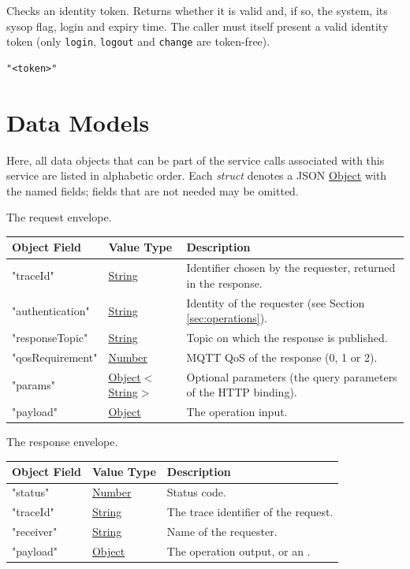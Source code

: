 \documentclass[a4paper]{arrowhead}
\newcommand{\mref}[2][]{{\textcolor{ArrowheadPurple}{\hyperref[sec:model:#2]{\ifstrempty{#1}{#2}{#1}}}}}
\newcommand{\oref}[1]{{\textcolor{ArrowheadBlue}{\hyperref[sec:operations:#1]{#1}}}}
\newcommand{\pref}[1]{{\textcolor{ArrowheadGrey}{\hyperref[sec:model:primitives:#1]{#1}}}}
\begin{document}
Checks an identity token. Returns whether it is valid and, if so, the system, its sysop flag, login and expiry time. The caller must itself present a valid identity token (only \texttt{login}, \texttt{logout} and \texttt{change} are token-free).

\begin{lstlisting}[caption={Payload of an \oref{identity-verify} request.}]
"<token>"
\end{lstlisting}

\newpage

\section{Data Models}
\label{sec:model}

Here, all data objects that can be part of the service calls associated with this service are listed in alphabetic order.
Each \textit{struct} denotes a JSON \pref{Object} with the named fields; fields that are not needed may be omitted.


The request envelope.

\noindent\begin{tabularx}{\textwidth}{| p{4.25cm} | p{3.5cm} | X |} \hline
\rowcolor{gray!33} Object Field & Value Type & Description \\ \hline
"traceId" & \pref{String} & Identifier chosen by the requester, returned in the response. \\ \hline
"authentication" & \pref{String} & Identity of the requester (see Section \ref{sec:operations}). \\ \hline
"responseTopic" & \pref{String} & Topic on which the response is published. \\ \hline
"qosRequirement" & \pref{Number} & MQTT QoS of the response (0, 1 or 2). \\ \hline
"params" & \pref{Object}$<$\pref{String}$>$ & Optional parameters (the query parameters of the HTTP binding). \\ \hline
"payload" & \pref{Object} & The operation input. \\ \hline
\end{tabularx}


The response envelope.

\noindent\begin{tabularx}{\textwidth}{| p{4.25cm} | p{3.5cm} | X |} \hline
\rowcolor{gray!33} Object Field & Value Type & Description \\ \hline
"status" & \pref{Number} & Status code. \\ \hline
"traceId" & \pref{String} & The trace identifier of the request. \\ \hline
"receiver" & \pref{String} & Name of the requester. \\ \hline
"payload" & \pref{Object} & The operation output, or an \mref{ErrorMessage}. \\ \hline
\end{tabularx}
\end{document}
